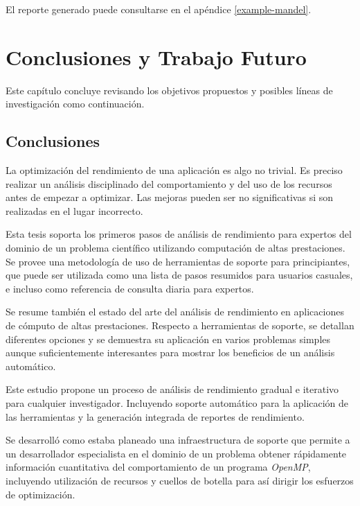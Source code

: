 \documentclass[a4paper]{report}
\begin{document}
\bigskip

El reporte generado puede consultarse en el apéndice \ref{example-mandel}.

\chapter{Conclusiones y Trabajo Futuro} \label{Conclusiones y Trabajo Futuro}

Este capítulo concluye revisando los objetivos propuestos y posibles líneas de investigación como continuación.

\section{Conclusiones}

La optimización del rendimiento de una aplicación es algo no trivial.
Es preciso realizar un análisis disciplinado del comportamiento y del uso de los recursos antes de
empezar a optimizar. Las mejoras pueden ser no significativas si son realizadas en el lugar incorrecto.

\bigskip

Esta tesis soporta los primeros pasos de análisis de rendimiento para expertos del dominio de un problema científico utilizando computación de altas prestaciones. Se provee una metodología de uso de herramientas de soporte para principiantes, que puede ser utilizada como una lista de pasos resumidos para usuarios casuales, e incluso como referencia de consulta diaria para expertos.

\bigskip

Se resume también el estado del arte del análisis de rendimiento en aplicaciones de cómputo de altas prestaciones. Respecto a herramientas de soporte, se detallan diferentes opciones y se demuestra su aplicación en varios problemas simples aunque suficientemente interesantes para mostrar los beneficios de un análisis automático. 

\bigskip

Este estudio propone un proceso de análisis de rendimiento gradual e iterativo para cualquier investigador. 
Incluyendo soporte automático para la aplicación de las herramientas y la generación integrada de
reportes de rendimiento.

\bigskip

Se desarrolló como estaba planeado una infraestructura de soporte que permite a un desarrollador especialista en el dominio de un problema obtener rápidamente información cuantitativa del comportamiento de un programa {\it OpenMP}, incluyendo utilización de recursos y cuellos de botella para así dirigir los esfuerzos de optimización.
\end{document}
